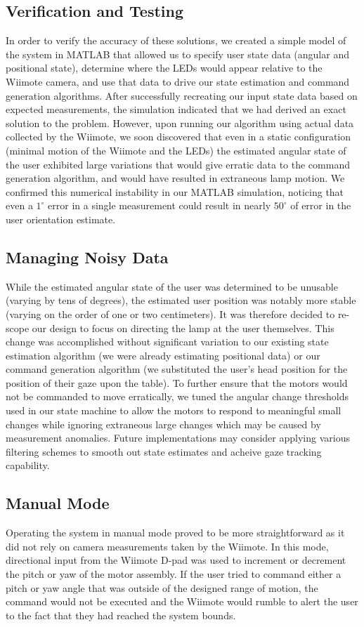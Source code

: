 \documentclass[conference, twocolumn]{IEEEtran}
\newcommand{\degree}{^{\circ}}
\begin{document}
\subsection{Verification and Testing}
In order to verify the accuracy of these solutions, we created a simple model of the system in MATLAB that allowed us to specify user state data (angular and positional state), determine where the LEDs would appear relative to the Wiimote camera, and use that data to drive our state estimation and command generation algorithms. After successfully recreating our input state data based on expected measurements, the simulation indicated that we had derived an exact solution to the problem. However, upon running our algorithm using actual data collected by the Wiimote, we soon discovered that even in a static configuration (minimal motion of the Wiimote and the LEDs) the estimated angular state of the user exhibited large variations that would give erratic data to the command generation algorithm, and would have resulted in extraneous lamp motion. We confirmed this numerical instability in our MATLAB simulation, noticing that even a $1\degree$ error in a single measurement could result in nearly $50\degree$ of error in the user orientation estimate.

\subsection{Managing Noisy Data}
While the estimated angular state of the user was determined to be unusable (varying by tens of degrees), the estimated user position was notably more stable (varying on the order of one or two centimeters). It was therefore decided to re-scope our design to focus on directing the lamp at the user themselves. This change was accomplished without significant variation to our existing state estimation algorithm (we were already estimating positional data) or our command generation algorithm (we substituted the user's head position for the position of their gaze upon the table). To further ensure that the motors would not be commanded to move erratically, we tuned the angular change thresholds used in our state machine to allow the motors to respond to meaningful small changes while ignoring extraneous large changes which may be caused by measurement anomalies. Future implementations may consider applying various filtering schemes to smooth out state estimates and acheive gaze tracking capability.

\subsection{Manual Mode}
Operating the system in manual mode proved to be more straightforward as it did not rely on camera measurements taken by the Wiimote. In this mode, directional input from the Wiimote D-pad was used to increment or decrement the pitch or yaw of the motor assembly. If the user tried to command either a pitch or yaw angle that was outside of the designed range of motion, the command would not be executed and the Wiimote would rumble to alert the user to the fact that they had reached the system bounds.
\end{document}
